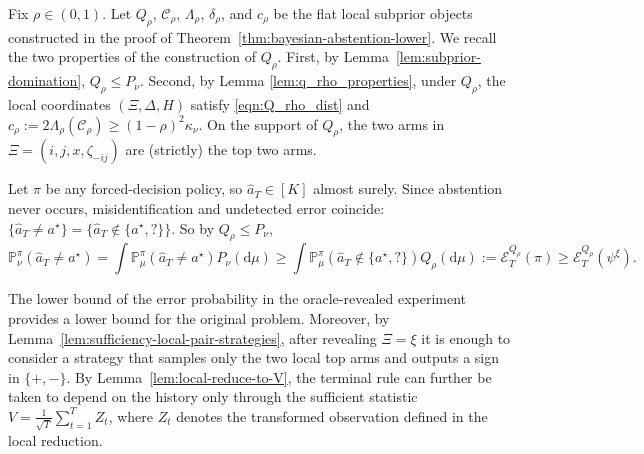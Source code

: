 \documentclass[10pt]{article}
\newcommand{\dd}{\mathrm{d}}
\theoremstyle{plain}
\begin{document}
Fix $\rho\in(0,1)$. Let $Q_\rho$, $\mathcal{C}_\rho$, $\Lambda_\rho$,
$\delta_\rho$, and $c_\rho$ be the flat local subprior objects
constructed in the proof of Theorem~\ref{thm:bayesian-abstention-lower}. We
recall the two properties of the construction of $Q_\rho$. First, by Lemma~\ref{lem:subprior-domination},
$Q_\rho\le P_\nu $.
Second, by Lemma \ref{lem:q_rho_properties}, under $Q_\rho$, the local coordinates
$(\Xi,\Delta,H)$ satisfy \eqref{eqn:Q_rho_dist}
and
    $c_\rho:=
    2\Lambda_\rho(\mathcal{C}_\rho)
    \ge
    (1-\rho)^2\kappa_\nu $.
On the support of $Q_\rho$, the two arms in $\Xi=(i,j,x,\zeta_{-ij})$ are (strictly) the top two arms.

Let $\pi$ be any forced-decision policy, so 
$\hat a_T\in[K]$ almost surely. Since abstention never occurs,
misidentification and undetected error coincide:
$\{\hat a_T\neq a^\star\}
=
\{\hat a_T\notin\{a^\star,?\}\}$.
So by $Q_\rho\le P_\nu $,
\begin{equation}
\label{eq:no-abstention-risk-domination}
\mathbb{P}_\nu^\pi(\hat{a}_T \neq a^\star) 
= \int \mathbb{P}_\mu^\pi(\hat{a}_T \neq a^\star) P_\nu(\dd\mu) 
\ge \int \mathbb{P}_\mu^\pi(\hat{a}_T \notin \{a^\star, ?\}) Q_\rho(\dd\mu) 
:= \mathcal{E}_T^{Q_\rho}(\pi)
\ge \mathcal{E}_T^{Q_\rho}(\psi^\xi).
\end{equation}

The lower bound of the error probability in the oracle-revealed experiment provides a lower bound for the original problem. Moreover, by Lemma~\ref{lem:sufficiency-local-pair-strategies}, after
revealing $\Xi=\xi$ it is enough to consider a strategy that samples only the
two local top arms and outputs a sign in $\{+,-\}$. By
Lemma~\ref{lem:local-reduce-to-V}, the terminal rule can further be taken to
depend on the history only through the sufficient statistic
$V=\frac1{\sqrt T}\sum_{t=1}^T Z_t$,
where $Z_t$ denotes the transformed observation defined in the local reduction.
\end{document}
